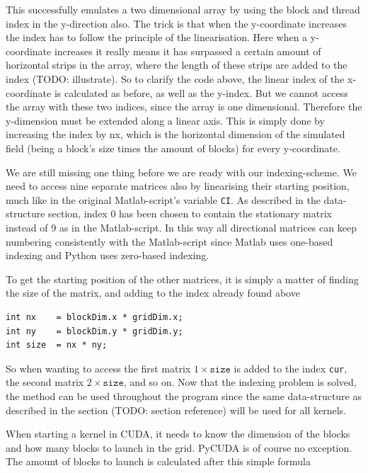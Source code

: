 This successfully emulates a two dimensional array by using the block and thread index in the y-direction also. The trick is that when the y-coordinate increases the index has to follow the principle of the linearisation. Here when a y-coordinate increases it really means it has surpassed a certain amount of horizontal strips in the array, where the length of these strips are added to the index (TODO: illustrate). So to clarify the code above, the linear index of the x-coordinate is calculated as before, as well as the y-index. But we cannot access the array with these two indices, since the array is one dimensional. Therefore the y-dimension must be extended along a linear axis. This is simply done by increasing the index by nx, which is the horizontal dimension of the simulated field (being a block's size times the amount of blocks) for every y-coordinate.

We are still missing one thing before we are ready with our indexing-scheme. We need to access nine separate matrices also by linearising their starting position, much like in the original Matlab-script's variable \texttt{CI}. As described in the data-structure section, index 0 has been chosen to contain the stationary matrix instead of 9 as in the Matlab-script. In this way all directional matrices can keep numbering consistently with the Matlab-script since Matlab uses one-based indexing and Python uses zero-based indexing.

To get the starting position of the other matrices, it is simply a matter of finding the size of the matrix, and adding to the index already found above

\begin{verbatim}
int nx    = blockDim.x * gridDim.x;
int ny    = blockDim.y * gridDim.y;
int size  = nx * ny;
\end{verbatim}

So when wanting to access the first matrix $1 \times \mathrm{\texttt{size}}$ is added to the index \texttt{cur}, the second matrix $2 \times \mathrm{\texttt{size}}$, and so on. Now that the indexing problem is solved, the method can be used throughout the program since the same data-structure as described in the section (TODO: section reference) will be used for all kernels.

When starting a kernel in CUDA, it needs to know the dimension of the blocks and how many blocks to launch in the grid. PyCUDA is of course no exception. The amount of blocks to launch is calculated after this simple formula

